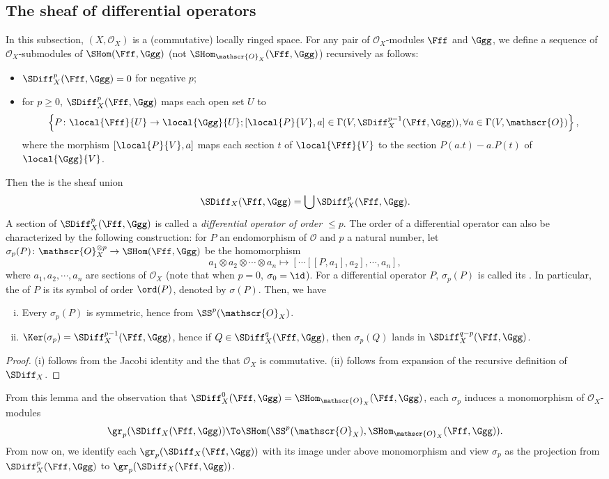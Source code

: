 \subsection{The sheaf of differential operators}
In this subsection, $(X,\mathscr{O}_X)$ is a (commutative) locally ringed space. 
For any pair of $\mathscr{O}_X$-modules $\Fff$ and $\Ggg$, 
we define a sequence of $\mathscr{O}_X$-submodules of 
$\SHom(\Fff,\Ggg)$ (not $\SHom_{\mathscr{O}_X}(\Fff,\Ggg)$)
recursively as follows:
\begin{itemize}
\item $\SDiff_X^p(\Fff,\Ggg)=0$ for negative $p$;
\item for $p\ge0$, $\SDiff_X^p(\Fff,\Ggg)$ maps each open set $U$ to
\[
\left\{P\colon\local{\Fff}{U}\to\local{\Ggg}{U};
[\local{P}{V},a]\in\Gamma(V,\SDiff_X^{p-1}(\Fff,\Ggg)),
\forall a\in\Gamma(V,\mathscr{O})\right\},
\]
where the morphism $[\local{P}{V},a]$ maps each section $t$ of 
$\local{\Fff}{V}$ to the section $P(a.t)-a.P(t)$ of $\local{\Ggg}{V}$.
\end{itemize}
Then the  
is the sheaf union 
\[
\SDiff_X(\Fff,\Ggg)=\bigcup\SDiff_X^p(\Fff,\Ggg).
\]
A section of $\SDiff_X^p(\Fff,\Ggg)$ is called a 
\emph{differential operator of order $\le p$}. 
The order of a differential operator can also be characterized by 
the following construction: 
for $P$ an endomorphism of $\mathscr{O}$ and $p$ a natural number, 
let $\sigma_p(P)\colon\mathscr{O}_X^{\otimes p}\to\SHom(\Fff,\Ggg)$ 
be the homomorphism 
\[
a_1\otimes a_2\otimes\cdots\otimes a_n 
\mapsto [\cdots[[P,a_1],a_2],\cdots,a_n],
\]
where $a_1,a_2,\cdots,a_n$ are sections of $\mathscr{O}_X$ 
(note that when $p=0$, $\sigma_0=\id$). 
For a differential operator $P$, 
$\sigma_p(P)$ is called its . 
In particular, 
the  of $P$ is its symbol of order $\ord(P)$, 
denoted by $\sigma(P)$. 
Then, we have
\begin{lem}
\begin{enumerate}[(i)]
\item Every $\sigma_p(P)$ is symmetric, hence from $\SS^p(\mathscr{O}_X)$.
\item $\Ker(\sigma_p)=\SDiff_X^{p-1}(\Fff,\Ggg)$, 
hence if $Q\in\SDiff_X^q(\Fff,\Ggg)$, 
then $\sigma_p(Q)$ lands in $\SDiff_X^{q-p}(\Fff,\Ggg)$.
\end{enumerate}
\end{lem}
\begin{proof}
(i) follows from the Jacobi identity and the that $\mathscr{O}_X$ is commutative. 
(ii) follows from expansion of the recursive definition of $\SDiff_X$.
\end{proof}
From this lemma and the observation that 
$\SDiff_X^0(\Fff,\Ggg)=\SHom_{\mathscr{O}_X}(\Fff,\Ggg)$, 
each $\sigma_p$ induces a monomorphism of $\mathscr{O}_X$-modules 
\[
\gr_p(\SDiff_X(\Fff,\Ggg))\To
\SHom(\SS^p(\mathscr{O}_X),\SHom_{\mathscr{O}_X}(\Fff,\Ggg)).
\]
From now on, we identify each $\gr_p(\SDiff_X(\Fff,\Ggg))$ with its image 
under above monomorphism and 
view $\sigma_p$ as the projection 
from $\SDiff_X^p(\Fff,\Ggg)$ to $\gr_p(\SDiff_X(\Fff,\Ggg))$.

